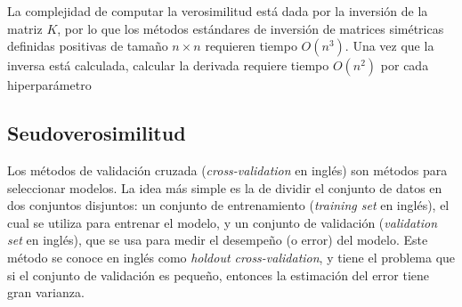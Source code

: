 La complejidad de computar la verosimilitud está dada por la inversión de la matriz \(K\), por lo que los métodos estándares de inversión de matrices simétricas definidas positivas de tamaño \(n \times n\) requieren tiempo \(O(n^{3})\). Una vez que la inversa está calculada, calcular la derivada requiere tiempo \(O(n^2)\) por cada hiperparámetro

\subsection{Seudoverosimilitud}

Los métodos de validación cruzada (\emph{cross-validation} en inglés) son métodos para seleccionar modelos. La idea más simple es la de dividir el conjunto de datos en dos conjuntos disjuntos: un conjunto de entrenamiento (\emph{training set} en inglés), el cual se utiliza para entrenar el modelo, y un conjunto de validación (\emph{validation set} en inglés), que se usa para medir el desempeño (o error) del modelo. Este método se conoce en inglés como \emph{holdout cross-validation}, y tiene el problema que si el conjunto de validación es pequeño, entonces la estimación del error tiene gran varianza.

